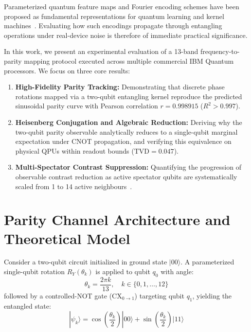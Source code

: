 \documentclass[11pt,a4paper]{article}
\begin{document}
Parameterized quantum feature maps and Fourier encoding schemes have been proposed as fundamental representations for quantum learning and kernel machines~\cite{schuld2021encoding,suzuki2020ansatz,chen2021variational}. Evaluating how such encodings propagate through entangling operations under real-device noise is therefore of immediate practical significance.

In this work, we present an experimental evaluation of a 13-band frequency-to-parity mapping protocol executed across multiple commercial IBM Quantum processors. We focus on three core results:
\begin{enumerate}
  \item \textbf{High-Fidelity Parity Tracking:} Demonstrating that discrete phase rotations mapped via a two-qubit entangling kernel reproduce the predicted sinusoidal parity curve with Pearson correlation $r = 0.998915$ ($R^2 > 0.997$).
  \item \textbf{Heisenberg Conjugation and Algebraic Reduction:} Deriving why the two-qubit parity observable analytically reduces to a single-qubit marginal expectation under CNOT propagation, and verifying this equivalence on physical QPUs within readout bounds ($\text{TVD} = 0.047$).
  \item \textbf{Multi-Spectator Contrast Suppression:} Quantifying the progression of observable contrast reduction as active spectator qubits are systematically scaled from 1 to 14 active neighbours~\cite{mundada2019crosstalk,kandala2017hardware}.
\end{enumerate}

\section{Parity Channel Architecture and Theoretical Model}
Consider a two-qubit circuit initialized in ground state $|00\rangle$. A parameterized single-qubit rotation $R_Y(\theta_k)$ is applied to qubit $q_0$ with angle:
\begin{equation}
  \theta_k = \frac{2\pi k}{13}, \quad k \in \{0, 1, \dots, 12\}
\end{equation}
followed by a controlled-NOT gate ($\text{CX}_{0 \to 1}$) targeting qubit $q_1$, yielding the entangled state:
\begin{equation}
  |\psi_k\rangle = \cos\left(\frac{\theta_k}{2}\right)|00\rangle + \sin\left(\frac{\theta_k}{2}\right)|11\rangle
\end{equation}
\end{document}
